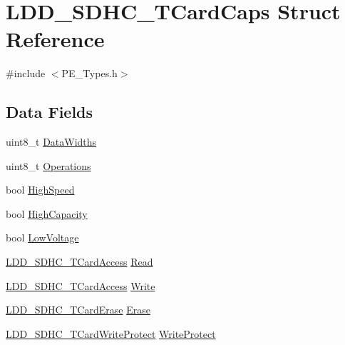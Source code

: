 \hypertarget{struct_l_d_d___s_d_h_c___t_card_caps}{}\section{L\+D\+D\+\_\+\+S\+D\+H\+C\+\_\+\+T\+Card\+Caps Struct Reference}
\label{struct_l_d_d___s_d_h_c___t_card_caps}


{\ttfamily \#include $<$P\+E\+\_\+\+Types.\+h$>$}

\subsection*{Data Fields}
\begin{DoxyCompactItemize}
\item 
uint8\+\_\+t \hyperlink{struct_l_d_d___s_d_h_c___t_card_caps_a79fc1f5a77986075f37dfc967fc7e839}{Data\+Widths}
\item 
uint8\+\_\+t \hyperlink{struct_l_d_d___s_d_h_c___t_card_caps_a4af30c5df5445720a0da2f6abdcc9629}{Operations}
\item 
bool \hyperlink{struct_l_d_d___s_d_h_c___t_card_caps_a382fb9e854ee58ba00f5e390345dad9c}{High\+Speed}
\item 
bool \hyperlink{struct_l_d_d___s_d_h_c___t_card_caps_aecde13a16eb437017641776270f9479c}{High\+Capacity}
\item 
bool \hyperlink{struct_l_d_d___s_d_h_c___t_card_caps_a283a376bda2540641d83cde61d1e0188}{Low\+Voltage}
\item 
\hyperlink{struct_l_d_d___s_d_h_c___t_card_access}{L\+D\+D\+\_\+\+S\+D\+H\+C\+\_\+\+T\+Card\+Access} \hyperlink{struct_l_d_d___s_d_h_c___t_card_caps_ae5a39842e7b8c28f9246d3fc1b9a8f54}{Read}
\item 
\hyperlink{struct_l_d_d___s_d_h_c___t_card_access}{L\+D\+D\+\_\+\+S\+D\+H\+C\+\_\+\+T\+Card\+Access} \hyperlink{struct_l_d_d___s_d_h_c___t_card_caps_ad28c378a6b9edfbd726a8019d5c8be79}{Write}
\item 
\hyperlink{struct_l_d_d___s_d_h_c___t_card_erase}{L\+D\+D\+\_\+\+S\+D\+H\+C\+\_\+\+T\+Card\+Erase} \hyperlink{struct_l_d_d___s_d_h_c___t_card_caps_afc5bbe5bce7267f930d6e8501ac5d2ea}{Erase}
\item 
\hyperlink{struct_l_d_d___s_d_h_c___t_card_write_protect}{L\+D\+D\+\_\+\+S\+D\+H\+C\+\_\+\+T\+Card\+Write\+Protect} \hyperlink{struct_l_d_d___s_d_h_c___t_card_caps_a32ecbbace3b435b1d70a57b09bf9662b}{Write\+Protect}
\end{DoxyCompactItemize}


